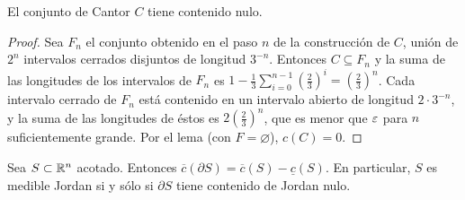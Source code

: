 \begin{eg}
  El conjunto de Cantor \(C\) tiene contenido nulo.
\end{eg}

\begin{proof}
  Sea \(F_n\) el conjunto obtenido en el paso \(n\) de la construcción de \(C\), unión de \(2^n\) intervalos cerrados disjuntos de longitud \(3^{-n}\). Entonces \(C \subseteq F_n\) y la suma de las longitudes de los intervalos de \(F_n\) es \(1 - \frac{1}{3} \sum_{i=0}^{n-1} {\left( \frac{2}{3} \right)}^i = {\left( \frac{2}{3} \right)}^n\). Cada intervalo cerrado de \(F_n\) está contenido en un intervalo abierto de longitud \(2 \cdot 3^{-n}\), y la suma de las longitudes de éstos es \(2 {\left( \frac{2}{3} \right)}^n\), que es menor que \(\varepsilon\) para \(n\) suficientemente grande. Por el lema (con \(F = \varnothing\)), \(c(C) = 0\).
\end{proof}

\begin{theorem}
  Sea \(S \subset \mathbb{R}^n\) acotado. Entonces \(\overline{c}(\partial S) = \overline{c}(S) - \underline{c}(S)\). En particular, \(S\) es medible Jordan si y sólo si \(\partial S\) tiene contenido de Jordan nulo.
\end{theorem}

